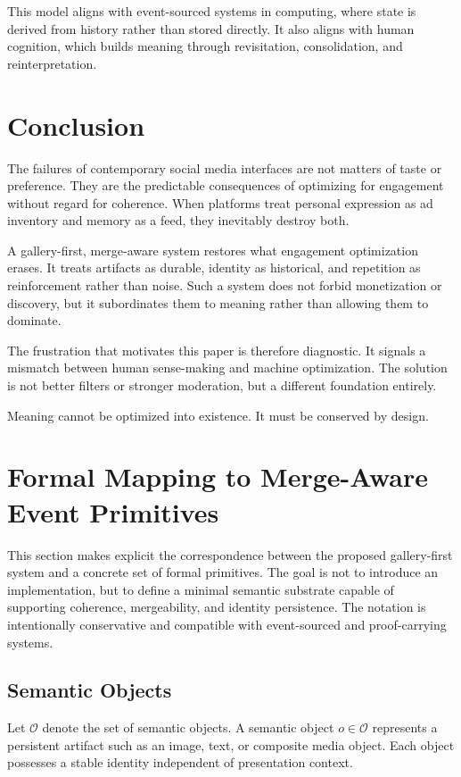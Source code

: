 \documentclass[11pt,oneside]{article}
\begin{document}
This model aligns with event-sourced systems in computing, where state is derived from history rather than stored directly. It also aligns with human cognition, which builds meaning through revisitation, consolidation, and reinterpretation.

\section{Conclusion}

The failures of contemporary social media interfaces are not matters of taste or preference. They are the predictable consequences of optimizing for engagement without regard for coherence. When platforms treat personal expression as ad inventory and memory as a feed, they inevitably destroy both.

A gallery-first, merge-aware system restores what engagement optimization erases. It treats artifacts as durable, identity as historical, and repetition as reinforcement rather than noise. Such a system does not forbid monetization or discovery, but it subordinates them to meaning rather than allowing them to dominate.

The frustration that motivates this paper is therefore diagnostic. It signals a mismatch between human sense-making and machine optimization. The solution is not better filters or stronger moderation, but a different foundation entirely.

Meaning cannot be optimized into existence. It must be conserved by design.

\section{Formal Mapping to Merge-Aware Event Primitives}

This section makes explicit the correspondence between the proposed gallery-first system and a concrete set of formal primitives. The goal is not to introduce an implementation, but to define a minimal semantic substrate capable of supporting coherence, mergeability, and identity persistence. The notation is intentionally conservative and compatible with event-sourced and proof-carrying systems.

\subsection{Semantic Objects}

Let $\mathcal{O}$ denote the set of semantic objects. A semantic object $o \in \mathcal{O}$ represents a persistent artifact such as an image, text, or composite media object. Each object possesses a stable identity independent of presentation context.
\end{document}
